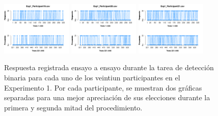 \begin{itemize}
\begin{figure}[th]
\includegraphics[width=0.30\textwidth]{Figures/Response_Exp1_P19} \includegraphics[width=0.30\textwidth]{Figures/Response_Exp1_P20} \includegraphics[width=0.30\textwidth]{Figures/Response_Exp1_P21} 
\caption[Response_Exp1]{Respuesta registrada ensayo a ensayo durante la tarea de detección binaria para cada uno de los veintiun participantes en el Experimento 1. Por cada participante, se muestran dos gráficas separadas para una mejor apreciación de sus elecciones durante la primera y segunda mitad del procedimiento.}
\label{fig:Response_E1}
\end{figure}




\end{itemize}
